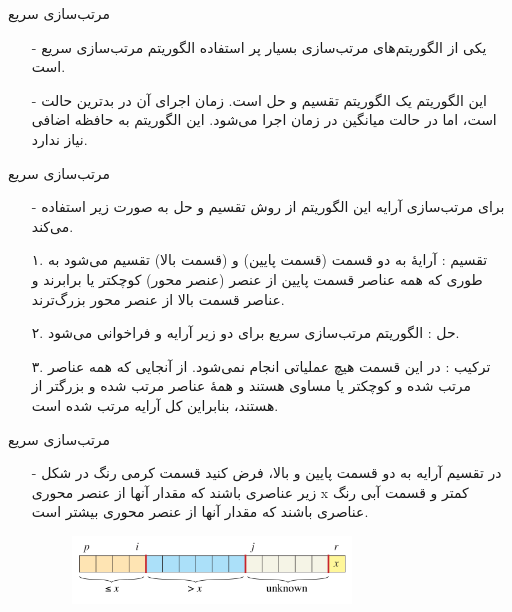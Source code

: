 
\begin{frame}{‌مرتب‌سازی سریع}
\begin{itemize}\itemr
\item[-]
یکی از الگوریتم‌های مرتب‌سازی بسیار پر استفاده الگوریتم مرتب‌سازی سریع
است.
\item[-]
این الگوریتم یک الگوریتم تقسیم و حل است. زمان اجرای آن در بدترین حالت
است، اما در حالت میانگین در زمان
اجرا می‌شود. این الگوریتم به حافظه اضافی نیاز ندارد.
\end{itemize}
\end{frame}


\begin{frame}{‌مرتب‌سازی سریع}
\begin{itemize}\itemr
\item[-]
برای مرتب‌سازی آرایه
این الگوریتم از روش تقسیم و حل به صورت زیر استفاده می‌کند.
\item[۱.]
تقسیم : آرایهٔ
به دو قسمت
(قسمت پایین)
و
(قسمت بالا)
تقسیم می‌شود به طوری که همه عناصر قسمت پایین از عنصر
(عنصر محور)
کوچکتر یا برابرند و عناصر قسمت بالا از عنصر محور بزرگ‌ترند.
\item[۲.]
حل : الگوریتم مرتب‌سازی سریع برای دو زیر آرایه
و
فراخوانی می‌شود.
\item[۳.]
ترکیب : در این قسمت هیچ عملیاتی انجام نمی‌شود. از آنجایی که همه عناصر
مرتب شده و کوچکتر یا مساوی
هستند و همهٔ عناصر
مرتب شده و بزرگتر از
هستند، بنابراین کل آرایه
مرتب شده است.
\end{itemize}
\end{frame}

\begin{frame}{‌مرتب‌سازی سریع}
\begin{itemize}\itemr
\item[-]
در تقسیم آرایه به دو قسمت پایین و بالا، فرض کنید قسمت کرمی رنگ در شکل زیر عناصری باشند که مقدار آنها از عنصر محوری x کمتر و قسمت آبی رنگ عناصری باشند که مقدار آنها از عنصر محوری بیشتر است.
\begin{figure}
\includegraphics[width=0.7\textwidth]{figs/chap03/quicksort1}
\end{figure}
\end{itemize}
\end{frame}


